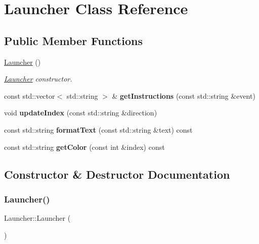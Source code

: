 \hypertarget{class_launcher}{}\section{Launcher Class Reference}
\label{class_launcher}
\subsection*{Public Member Functions}
\begin{DoxyCompactItemize}
\item 
\hyperlink{class_launcher_a7be10dda45e4e1704c05b6284b60f9c5}{Launcher} ()
\begin{DoxyCompactList}\small\item\em \hyperlink{class_launcher}{Launcher} constructor. \end{DoxyCompactList}\item 
\mbox{\label{class_launcher_a4cfd9a0c7ad40c110f9a38662dde5db1}} 
const std\+::vector$<$ std\+::string $>$ \& {\bfseries get\+Instructions} (const std\+::string \&event)
\item 
\mbox{\label{class_launcher_aba555060beb5382e816709f8a7571c38}} 
void {\bfseries update\+Index} (const std\+::string \&direction)
\item 
\mbox{\label{class_launcher_a875d96b76e44deffa7229c92486db4c7}} 
const std\+::string {\bfseries format\+Text} (const std\+::string \&text) const
\item 
\mbox{\label{class_launcher_a403b3f5149cb3b727df45f9ca6b4d1c9}} 
const std\+::string {\bfseries get\+Color} (const int \&index) const
\end{DoxyCompactItemize}


\subsection{Constructor \& Destructor Documentation}
\mbox{\label{class_launcher_a7be10dda45e4e1704c05b6284b60f9c5}} 
\subsubsection{\texorpdfstring{Launcher()}{Launcher()}}
{\footnotesize\ttfamily Launcher\+::\+Launcher (\begin{DoxyParamCaption}{ }\end{DoxyParamCaption})}



